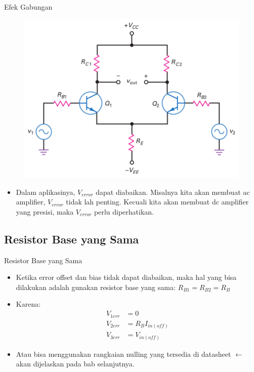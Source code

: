 \documentclass[aspectratio=169]{beamer}
\begin{document}
\begin{frame}{Efek Gabungan}
	\begin{multicols}{2}
		\begin{figure}
			\centering
			\includegraphics[height=0.6\textheight]{gambar/01.output_of_diff_amp_includes_desired_signal_and_error_voltage}
		\end{figure}
		\columnbreak
		\begin{itemize}
			\item Dalam aplikasinya, $ V_{error} $ dapat diabaikan. Misalnya kita akan membuat ac amplifier, $ V_{error} $ tidak lah penting. Kecuali kita akan membuat dc amplifier yang presisi, maka $ V_{error} $ perlu diperhatikan.
		\end{itemize}
	\end{multicols}
\end{frame}

\subsection{Resistor Base yang Sama}
\begin{frame}{Resistor Base yang Sama}
	\begin{itemize}
		\item Ketika error offset dan bias tidak dapat diabaikan, maka hal yang bisa dilakukan adalah gunakan resistor base yang sama: $ R_{B1} = R_{B2} = R_{B}$
		\item Karena:
		\begin{align*}
			V_{1err} &= 0 \\
			V_{2err} &= R_B I_{in(off)} \\
			V_{3err} &= V_{in(off)}
		\end{align*}
		\item Atau bisa menggunakan rangkaian nulling yang tersedia di datasheet $ \leftarrow $ akan dijelaskan pada bab selanjutnya.
	\end{itemize}
\end{frame}
\end{document}
